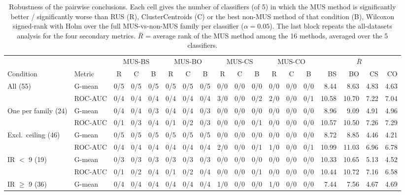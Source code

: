 \begin{table}[!htbp]
\centering
\caption{Robustness of the pairwise conclusions. Each cell gives the number of classifiers (of 5) in which the MUS method is significantly better / significantly worse than RUS (R), ClusterCentroids (C) or the best non-MUS method of that condition (B), Wilcoxon signed-rank with Holm over the full MUS-vs-non-MUS family per classifier ($\alpha=0.05$). The last block repeats the all-datasets analysis for the four secondary metrics. $\bar{R}$ = average rank of the MUS method among the 16 methods, averaged over the 5 classifiers.}
\label{tab:robustness}
\scriptsize
\setlength{\tabcolsep}{2.5pt}
\begin{adjustbox}{max width=\linewidth}
\begin{tabular}{llccccccccccccrrrr}
\toprule
 & & \multicolumn{3}{c}{MUS-BS} & \multicolumn{3}{c}{MUS-BO} & \multicolumn{3}{c}{MUS-CS} & \multicolumn{3}{c}{MUS-CO} & \multicolumn{4}{c}{$\bar{R}$} \\
\cmidrule(lr){3-5}\cmidrule(lr){6-8}\cmidrule(lr){9-11}\cmidrule(lr){12-14}\cmidrule(lr){15-18}
Condition & Metric & R & C & B & R & C & B & R & C & B & R & C & B & BS & BO & CS & CO \\
\midrule
All (55) & G-mean & 0/5 & 0/5 & 0/5 & 0/5 & 0/5 & 0/5 & 0/0 & 0/0 & 0/0 & 0/0 & 0/0 & 0/0 & 8.44 & 8.63 & 4.83 & 4.63 \\
 & ROC-AUC & 0/4 & 0/4 & 0/4 & 0/4 & 0/4 & 0/4 & 3/0 & 0/0 & 0/2 & 2/0 & 0/0 & 0/1 & 10.58 & 10.70 & 7.22 & 7.04 \\
\midrule
One per family (24) & G-mean & 0/4 & 0/4 & 0/3 & 0/4 & 0/4 & 0/3 & 0/0 & 0/0 & 0/0 & 0/0 & 0/0 & 0/0 & 8.96 & 9.09 & 4.91 & 4.96 \\
 & ROC-AUC & 0/1 & 0/3 & 0/4 & 0/1 & 0/2 & 0/3 & 0/0 & 0/0 & 0/1 & 0/0 & 0/0 & 0/0 & 10.57 & 10.50 & 7.26 & 7.29 \\
\midrule
Excl.\ ceiling (46) & G-mean & 0/5 & 0/5 & 0/5 & 0/5 & 0/5 & 0/5 & 0/0 & 0/0 & 0/0 & 0/0 & 0/0 & 0/0 & 8.72 & 8.85 & 4.46 & 4.21 \\
 & ROC-AUC & 0/4 & 0/4 & 0/4 & 0/4 & 0/4 & 0/4 & 2/0 & 0/0 & 0/1 & 1/0 & 0/0 & 0/1 & 10.99 & 11.03 & 6.96 & 6.78 \\
\midrule
IR $<$ 9 (19) & G-mean & 0/3 & 0/3 & 0/3 & 0/3 & 0/3 & 0/3 & 0/0 & 0/0 & 0/0 & 0/0 & 0/0 & 0/0 & 10.33 & 10.65 & 5.13 & 4.52 \\
 & ROC-AUC & 0/1 & 0/2 & 0/4 & 0/1 & 0/2 & 0/4 & 0/0 & 0/0 & 0/1 & 0/0 & 0/0 & 0/0 & 10.44 & 10.72 & 7.16 & 6.58 \\
\midrule
IR $\geq$ 9 (36) & G-mean & 0/4 & 0/4 & 0/4 & 0/4 & 0/4 & 0/4 & 1/0 & 0/0 & 0/0 & 1/0 & 0/0 & 0/0 & 7.44 & 7.56 & 4.67 & 4.69 \\

\end{tabular}
\end{adjustbox}
\end{table}
